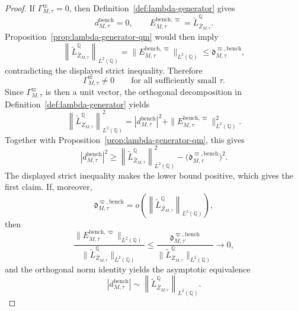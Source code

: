 \documentclass[11pt,a4paper]{amsart}
\theoremstyle{plain}
\theoremstyle{definition}
\theoremstyle{remark}
\newcommand{\QQ}{\mathbb{Q}}
\begin{document}
\begin{proof}
If \(\Gamma_{M,\tau}^{\varpi}=0\), then Definition~\ref{def:lambda-generator} gives
\[
        d_{M,\tau}^{\mathrm{bench}}=0,
        \qquad
        E_{M,\tau}^{\mathrm{bench},\varpi}
        =
        \widetilde L_{\bar Z_{M,\tau}}^\QQ.
\]
Proposition~\ref{prop:lambda-generator-qm} would then imply
\[
        \left\|
                \widetilde L_{\bar Z_{M,\tau}}^\QQ
        \right\|_{L^2(\QQ)}
        =
        \|E_{M,\tau}^{\mathrm{bench},\varpi}\|_{L^2(\QQ)}
        \le
        \mathfrak d_{M,\tau}^{\varpi,\mathrm{bench}},
\]
contradicting the displayed strict inequality.  Therefore
\[
        \Gamma_{M,\tau}^{\varpi}\neq0
        \qquad
        \text{for all sufficiently small }\tau.
\]
Since \(\Gamma_{M,\tau}^{\varpi}\) is then a unit vector, the orthogonal decomposition in
Definition~\ref{def:lambda-generator} yields
\[
        \left\|
                \widetilde L_{\bar Z_{M,\tau}}^\QQ
        \right\|_{L^2(\QQ)}^2
        =
        \left|
                d_{M,\tau}^{\mathrm{bench}}
        \right|^2
        +
        \|E_{M,\tau}^{\mathrm{bench},\varpi}\|_{L^2(\QQ)}^2.
\]
Together with Proposition~\ref{prop:lambda-generator-qm}, this gives
\[
        \left|
                d_{M,\tau}^{\mathrm{bench}}
        \right|^2
        \ge
        \left\|
                \widetilde L_{\bar Z_{M,\tau}}^\QQ
        \right\|_{L^2(\QQ)}^2
        -
        \bigl(
                \mathfrak d_{M,\tau}^{\varpi,\mathrm{bench}}
        \bigr)^2.
\]
The displayed strict inequality makes the lower bound positive, which gives the first claim.  If,
moreover,
\[
        \mathfrak d_{M,\tau}^{\varpi,\mathrm{bench}}
        =
        o\!\left(
                \left\|
                        \widetilde L_{\bar Z_{M,\tau}}^\QQ
                \right\|_{L^2(\QQ)}
        \right),
\]
then
\[
        \frac{
                \|E_{M,\tau}^{\mathrm{bench},\varpi}\|_{L^2(\QQ)}
        }{
                \|\widetilde L_{\bar Z_{M,\tau}}^\QQ\|_{L^2(\QQ)}
        }
        \le
        \frac{
                \mathfrak d_{M,\tau}^{\varpi,\mathrm{bench}}
        }{
                \|\widetilde L_{\bar Z_{M,\tau}}^\QQ\|_{L^2(\QQ)}
        }
        \to
        0,
\]
and the orthogonal norm identity yields the asymptotic equivalence
\[
        \left|
                d_{M,\tau}^{\mathrm{bench}}
        \right|
        \sim
        \left\|
                \widetilde L_{\bar Z_{M,\tau}}^\QQ
        \right\|_{L^2(\QQ)}.
\]
\end{proof}
\end{document}
